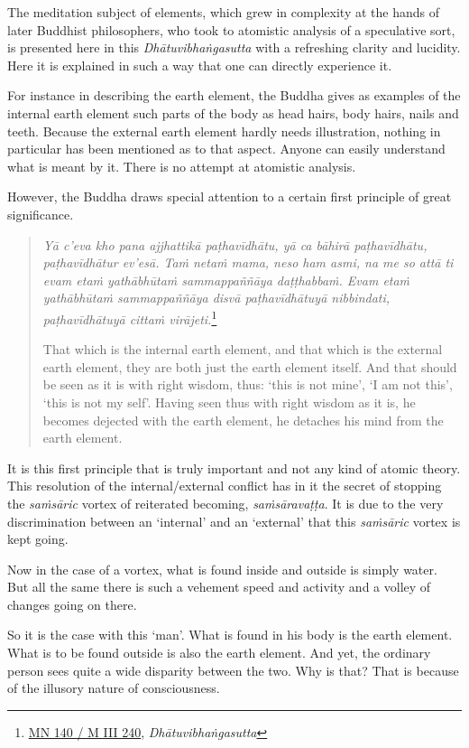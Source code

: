 The meditation subject of elements, which grew in complexity at the hands of later Buddhist philosophers, who took to atomistic analysis of a speculative sort, is presented here in this \emph{Dhātuvibhaṅgasutta} with a refreshing clarity and lucidity. Here it is explained in such a way that one can directly experience it.

For instance in describing the earth element, the Buddha gives as examples of the internal earth element such parts of the body as head hairs, body hairs, nails and teeth. Because the external earth element hardly needs illustration, nothing in particular has been mentioned as to that aspect. Anyone can easily understand what is meant by it. There is no attempt at atomistic analysis.

However, the Buddha draws special attention to a certain first principle of great significance.

\begin{quote}
\emph{Yā c'eva kho pana ajjhattikā paṭhavīdhātu, yā ca bāhirā paṭhavīdhātu, paṭhavīdhātur ev'esā. Taṁ netaṁ mama, neso ham asmi, na me so attā ti evam etaṁ yathābhūtaṁ sammappaññāya daṭṭhabbaṁ. Evam etaṁ yathābhūtaṁ sammappaññāya disvā paṭhavīdhātuyā nibbindati, paṭhavīdhātuyā cittaṁ virājeti.}\footnote{\href{https://suttacentral.net/mn140/pli/ms}{MN 140 / M III 240}, \emph{Dhātuvibhaṅgasutta}}

That which is the internal earth element, and that which is the external earth element, they are both just the earth element itself. And that should be seen as it is with right wisdom, thus: `this is not mine', `I am not this', `this is not my self'. Having seen thus with right wisdom as it is, he becomes dejected with the earth element, he detaches his mind from the earth element.
\end{quote}

It is this first principle that is truly important and not any kind of atomic theory. This resolution of the internal/external conflict has in it the secret of stopping the \emph{saṁsāric} vortex of reiterated becoming, \emph{saṁsāravaṭṭa}. It is due to the very discrimination between an `internal' and an `external' that this \emph{saṁsāric} vortex is kept going.

Now in the case of a vortex, what is found inside and outside is simply water. But all the same there is such a vehement speed and activity and a volley of changes going on there.

So it is the case with this `man'. What is found in his body is the earth element. What is to be found outside is also the earth element. And yet, the ordinary person sees quite a wide disparity between the two. Why is that? That is because of the illusory nature of consciousness.

